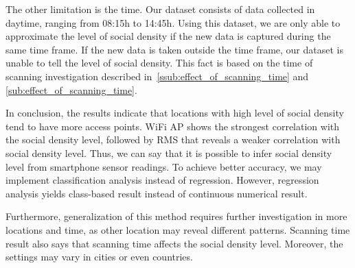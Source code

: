 
	The other limitation is the time. Our dataset consists of data collected in daytime, ranging from 08:15h to 14:45h. Using this dataset, we are only able to approximate the level of social density if the new data is captured during the same time frame. If the new data is taken outside the time frame, our dataset is unable to tell the level of social density. This fact is based on the time of scanning investigation described in~\autoref{ssub:effect_of_scanning_time} and \autoref{sub:effect_of_scanning_time}.
	

	

In conclusion, the results indicate that locations with high level of social density tend to have more access points. WiFi \ac{AP} shows the strongest correlation with the social density level, followed by \ac{RMS} that reveals a weaker correlation with social density level. Thus, we can say that it is possible to infer social density level from smartphone sensor readings. To achieve better accuracy, we may implement classification analysis instead of regression. However, regression analysis yields class-based result instead of continuous numerical result.

Furthermore, generalization of this method requires further investigation in more locations and time, as other location may reveal different patterns.
Scanning time result also says that scanning time affects the social density level. Moreover, the settings may vary in cities or even countries.



